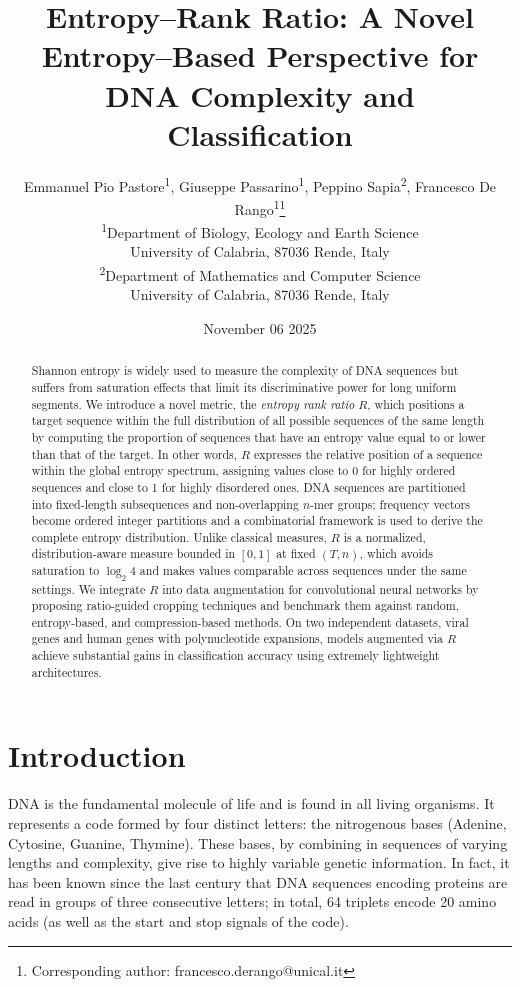 \documentclass{article}
\title{Entropy--Rank Ratio: A Novel Entropy--Based Perspective for DNA Complexity and Classification}
\author{%
Emmanuel Pio Pastore\orcidlink{0009-0007-7851-4414}\textsuperscript{1},
Giuseppe Passarino\orcidlink{0000-0003-4701-9748}\textsuperscript{1},
Peppino Sapia\orcidlink{0000-0003-3794-3232}\textsuperscript{2},
Francesco De Rango\orcidlink{0000-0002-2328-8487}\textsuperscript{1}\thanks{Corresponding author: francesco.derango@unical.it}\\[0.75em]
\textsuperscript{1}Department of Biology, Ecology and Earth Science\\
University of Calabria, 87036 Rende, Italy\\
\textsuperscript{2}Department of Mathematics and Computer Science\\
University of Calabria, 87036 Rende, Italy
}
\date{November 06 2025}
\theoremstyle{remark}
\begin{document}
\maketitle

\fontsize{11.5}{14}\selectfont
\sloppy

\begin{abstract}
Shannon entropy is widely used to measure the complexity of DNA sequences but suffers from saturation effects that limit its discriminative power for long uniform segments. We introduce a novel metric, the \emph{entropy rank ratio} $R$, which positions a target sequence within the full distribution of all possible sequences of the same length by computing the proportion of sequences that have an entropy value equal to or lower than that of the target. In other words, $R$ expresses the relative position of a sequence within the global entropy spectrum, assigning values close to 0 for highly ordered sequences and close to 1 for highly disordered ones. DNA sequences are partitioned into fixed-length subsequences and non-overlapping $n$-mer groups; frequency vectors become ordered integer partitions and a combinatorial framework is used to derive the complete entropy distribution. Unlike classical measures, \(R\) is a normalized, distribution-aware measure bounded in \([0,1]\) at fixed \((T,n)\), which avoids saturation to \(\log_2 4\) and makes values comparable across sequences under the same settings. We integrate $R$ into data augmentation for convolutional neural networks by proposing ratio-guided cropping techniques and benchmark them against random, entropy-based, and compression-based methods. On two independent datasets, viral genes and human genes with polynucleotide expansions, models augmented via $R$ achieve substantial gains in classification accuracy using extremely lightweight architectures.
\end{abstract}


\maketitle

\section{Introduction}

DNA is the fundamental molecule of life and is found in all living organisms. It represents a code formed by four distinct letters: the nitrogenous bases (Adenine, Cytosine, Guanine, Thymine). These bases, by combining in sequences of varying lengths and complexity, give rise to highly variable genetic information\cite{ref1}. In fact, it has been known since the last century that DNA sequences encoding proteins are read in groups of three consecutive letters; in total, 64 triplets encode 20 amino acids (as well as the start and stop signals of the code)\cite{ref2}.
\end{document}
